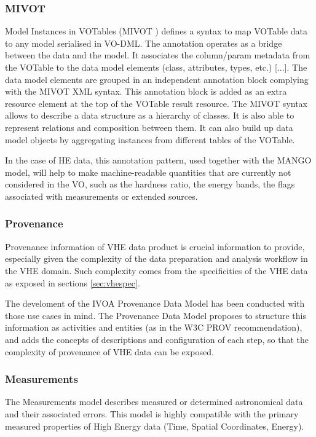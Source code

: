 \documentclass[11pt,a4paper]{ivoa}
\begin{document}
{\subsubsection{MIVOT}

Model Instances in VOTables (MIVOT \cite{2023ivoa.spec.0620M}) defines a syntax to map VOTable data to any model serialised in VO-DML.
The annotation operates as a bridge between the data and the model.
It associates the column/param metadata from the VOTable to the data model elements (class, attributes, types, etc.) [...].
The data model elements are grouped in an independent annotation block complying with the MIVOT XML syntax.
This annotation block is added as an extra resource element at the top of the VOTable result resource.
The MIVOT syntax allows to describe a data structure as a hierarchy of classes.
It is also able to represent relations and composition between them. It can also build up data model objects by aggregating instances from different tables of the VOTable.

In the case of HE data, this annotation pattern, used together with the MANGO model, will help to make machine-readable quantities that are currently not considered in the VO,
such as the hardness ratio, the energy bands, the flags associated with measurements or  extended sources.


\subsubsection{Provenance}

Provenance information of VHE data product is crucial information to provide, especially given the complexity of the data preparation and analysis workflow in the VHE domain. Such complexity comes from the specificities of the VHE data as exposed in sections \ref{sec:vhespec}.

The develoment of the IVOA Provenance Data Model \citep{2020ivoa.spec.0411S} has been conducted with those use cases in mind. The Provenance Data Model proposes to structure this information as activities and entities (as in the W3C PROV recommendation), and adds the concepts of descriptions and configuration of each step, so that the complexity of provenance of VHE data can be exposed.

\subsubsection{Measurements}

The Measurements model \citep{2022ivoa.spec.1004R} describes measured or determined astronomical data and their associated errors.
This model is highly compatible with the primary measured properties of High Energy data (Time, Spatial Coordinates, Energy).

}
\end{document}
